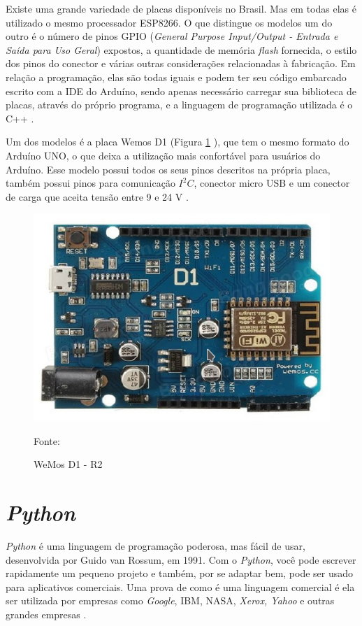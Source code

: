Existe uma grande variedade de placas disponíveis no Brasil.  Mas em todas elas é utilizado o mesmo processador ESP8266. O que distingue os modelos um do outro é o número de pinos GPIO (\textit{General Purpose Input/Output - Entrada e Saída para Uso Geral}) expostos, a quantidade de memória \textit{flash} fornecida, o estilo dos pinos do conector e várias outras considerações relacionadas à fabricação.  Em relação a  programação, elas são todas iguais e podem ter seu código embarcado escrito com a IDE do Arduíno, sendo apenas necessário carregar sua biblioteca de placas, através do próprio programa, e a linguagem de programação utilizada é o C++  \cite{kolban2016}.

Um dos modelos é a placa Wemos D1 (Figura \ref{wemosd1} ), que tem o mesmo formato do Arduíno UNO, o que deixa a utilização mais confortável para usuários do Arduíno. Esse modelo possui todos os seus pinos descritos na própria placa, também possui pinos para comunicação $I^2C$, conector micro USB e um conector de carga que aceita tensão entre 9 e 24 V \cite{kolban2016}\cite{wemos2017}.

\begin{figure}[h]
	\centering
	\includegraphics[keepaspectratio=true,scale=0.7
	]{figuras/wemosd1.png}
	\caption{ WeMos D1 - R2 }
	Fonte: \cite{wemos2017}
	\label{wemosd1}	
\end{figure}

\section{\textit{Python}}

\textit{Python} é uma linguagem de programação poderosa, mas fácil de usar, desenvolvida por Guido van Rossum, em 1991. Com o \textit{Python}, você pode escrever rapidamente um pequeno projeto e também, por se adaptar bem, pode ser usado para aplicativos comerciais. Uma prova de como é uma linguagem comercial é ela ser utilizada por empresas como \textit{Google}, IBM, NASA, \textit{Xerox, Yahoo} e outras grandes empresas \cite{dawson2010}.

